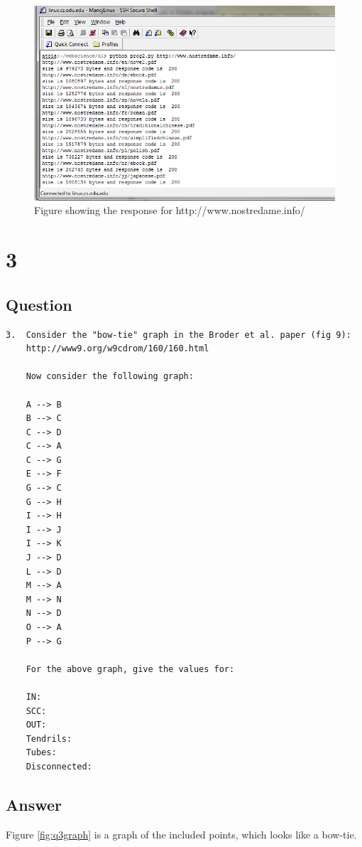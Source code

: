 \documentclass[letterpaper,11pt]{article}
\begin{document}
\begin{figure}
\includegraphics[scale=0.7]{novel.png}
\caption{ Figure showing the response for http://www.nostredame.info/}
\label{fig:screen7}
\end{figure}




\newpage




\newpage
\section*{3}

\subsection*{Question}

\begin{verbatim}
3.  Consider the "bow-tie" graph in the Broder et al. paper (fig 9):
    http://www9.org/w9cdrom/160/160.html

    Now consider the following graph:

    A --> B
    B --> C
    C --> D
    C --> A
    C --> G
    E --> F
    G --> C
    G --> H
    I --> H
    I --> J
    I --> K
    J --> D 
    L --> D
    M --> A
    M --> N
    N --> D
    O --> A
    P --> G 
    
    For the above graph, give the values for:

    IN: 
    SCC: 
    OUT: 
    Tendrils: 
    Tubes: 
    Disconnected:
\end{verbatim}

\newpage
\subsection*{Answer}
Figure \ref{fig:q3graph} is a graph of the included points, which looks like a bow-tie.
\end{document}
